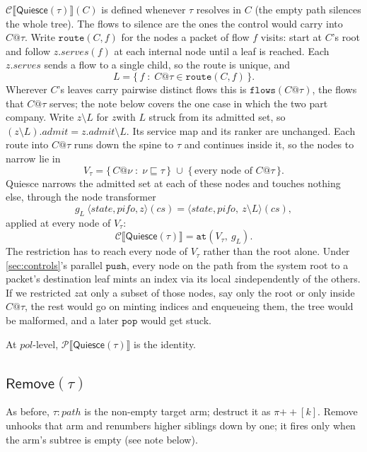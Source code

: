 \documentclass[sigplan,anonymous,review,nonacm]{acmart}
\newcommand{\push}{\ensuremath{\mathtt{push}}}
\newcommand{\pop}{\ensuremath{\mathtt{pop}}}
\newcommand{\csem}[1]{\mathcal{C}\llbracket #1 \rrbracket}
\newcommand{\psem}[1]{\mathcal{P}\llbracket #1 \rrbracket}
\newcommand{\notation}[1]{\ensuremath{#1}\ifmmode\else\xspace\fi}
\newcommand{\pol}{\notation{\mathit{pol}}}
\newcommand{\zz}{\notation{\mathit{z}}}
\newcommand{\Quiesce}{\textsf{Quiesce}}
\newcommand{\Remove}{\textsf{Remove}}
\begin{document}
\(\csem{\Quiesce(\tau)}(C)\) is defined whenever \(\tau\) resolves in \(C\) (the empty path silences the whole tree).
The flows to silence are the ones the control would carry into \(C@\tau\).
Write \(\mathtt{route}(C, f)\) for the nodes a packet of flow \(f\) visits: start at \(C\)'s root and follow \(\mathit{z}.\mathit{serves}(f)\) at each internal node until a leaf is reached.
Each \(\mathit{z}.\mathit{serves}\) sends a flow to a single child, so the route is unique, and
\[
L = \{\, f \;:\; C@\tau \in \mathtt{route}(C, f) \,\}.
\]
Wherever \(C\)'s leaves carry pairwise distinct flows this is \(\mathtt{flows}(C@\tau)\), the flows that \(C@\tau\) serves; the note below covers the one case in which the two part company.
Write \(\mathit{z} \setminus L\) for \zz with \(L\) struck from its admitted set, so \((\mathit{z} \setminus L).\mathit{admit} = \mathit{z}.\mathit{admit} \setminus L\).
Its service map and its ranker are unchanged.
Each route into \(C@\tau\) runs down the spine to \(\tau\) and continues inside it, so the nodes to narrow lie in
\[
V_\tau = \{\, C@\nu \;:\; \nu \sqsubseteq \tau \,\} \;\cup\; \{\, \text{every node of } C@\tau \,\}.
\] 
\Quiesce{} narrows the admitted set at each of these nodes and touches nothing else, through the node transformer
\[
g_L\ \langle\mathit{state},\mathit{pifo},\mathit{z}\rangle(\mathit{cs}) = \langle\mathit{state},\mathit{pifo},\ \mathit{z} \setminus L\rangle(\mathit{cs}),
\]
applied at every node of \(V_\tau\):
\[
\csem{\Quiesce(\tau)} = \mathtt{at}(V_\tau,\ g_L).
\]
The restriction has to reach every node of \(V_\tau\) rather than the root alone.
Under \cref{sec:controls}'s parallel \push{}, every node on the path from the system root to a packet's destination leaf mints an index via its local \zz independently of the others.
If we restricted \zz at only a subset of those nodes, say only the root or only inside \(C@\tau\), the rest would go on minting indices and enqueueing them, the tree would be malformed, and a later \pop{} would get stuck.

At \pol-level, \(\psem{\Quiesce(\tau)}\) is the identity.

\subsection{\texorpdfstring{\(\Remove(\tau)\)}{Remove}}\label{sec:remove}

As before, \(\tau : \mathit{path}\) is the non-empty target arm; destruct it as \(\pi \mathbin{+\!\!+} [k]\).
\Remove{} unhooks that arm and renumbers higher siblings down by one; it fires only when the arm's subtree is empty (see note below).
\end{document}
